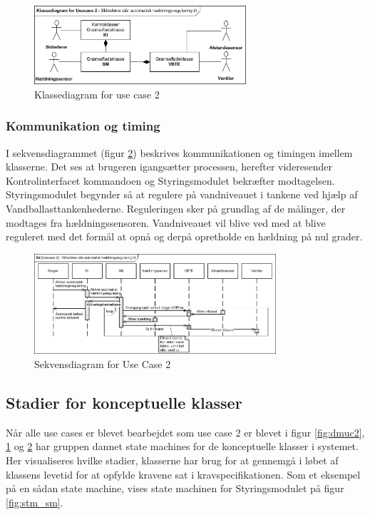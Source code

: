 \begin{figure}[H]
\centering
\includegraphics[width=0.7\textwidth]{billeder/Systemarkitektur/KD_UC2}
\caption{Klassediagram for use case 2}
\label{fig:kduc2}
\end{figure}


\subsubsection{Kommunikation og timing}
I sekvensdiagrammet (figur \ref{fig:sduc2}) beskrives kommunikationen og timingen imellem klasserne. Det ses at brugeren igangsætter processen, herefter videresender Kontrolinterfacet kommandoen og Styringsmodulet bekræfter modtagelsen. Styringsmodulet begynder så at regulere på vandniveauet i tankene ved hjælp af Vandballasttankenhederne. Reguleringen sker på grundlag af de målinger, der modtages fra hældningssensoren. Vandniveauet vil blive ved med at blive reguleret med det formål at opnå og derpå opretholde en hældning på nul grader.

\begin{figure}[H]
\centering
\includegraphics[width=0.8\textwidth]{billeder/Systemarkitektur/SD_UC2}
\caption{Sekvensdiagram for Use Case 2}
\label{fig:sduc2}
\end{figure}

\subsection{Stadier for konceptuelle klasser}
Når alle use cases er blevet bearbejdet som use case 2 er blevet i figur \ref{fig:dmuc2}, \ref{fig:kduc2} og \ref{fig:sduc2} har gruppen dannet state machines for de konceptuelle klasser i systemet. Her visualiseres hvilke stadier, klasserne har brug for at gennemgå i løbet af klassens levetid for at opfylde kravene sat i kravspecifikationen. Som et eksempel på en sådan state machine, vises state machinen for Styringsmodulet på figur \ref{fig:stm_sm}. \\

